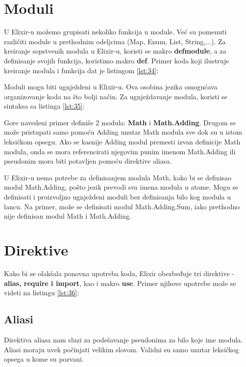 \documentclass[12pt,oneside]{memoir}
\begin{document}
\newpage

\section{Moduli}

U Elixir-u možemo grupisati nekoliko funkcija u module. Već su pomenuti različiti module u prethodnim odeljcima (Map, Enum, List, String,...). Za kreiranje sopstvenih modula u Elixir-u, koristi se  makro \textbf{defmodule}, a za definisanje svojih funkcija, koristimo makro \textbf{def}. Primer koda koji ilustruje kreiranje modula i funkcija dat je listingom \ref{lst:34}:



Moduli mogu biti ugnježdeni u Elixir-u. Ova osobina jezika omogućava organizovanje koda na što bolji način. Za ugnježdavanje modula, koristi se sintaksa sa listinga \ref{lst:35}:



Gore navedeni primer definiše 2 modula: \textbf{Math} i \textbf{Math.Adding}. Drugom se može pristupati samo pomoću Adding unutar Math modula sve dok su u istom leksičkom opsegu. Ako se kasnije Adding modul premesti izvan definicije Math modula, onda se mora referencirati njegovim punim imenom Math.Adding ili pseudonim mora biti potavljen pomoću direktive aliasa.

U Elixir-u nema potrebe za definisanjem modula Math, kako bi se definisao modul Math.Adding, pošto jezik prevodi sva imena modula u atome. Mogu se  definisati i proizvoljno ugnježdeni moduli bez definisanja bilo kog modula u lancu. Na primer, može se definisati modul Math.Adding.Sum, iako  prethodno nije definisan modul Math i Math.Adding.

\section{Direktive}

Kako bi se olakšala ponovna upotreba koda, Elixir obezbeđuje tri direktive - \textbf{alias, require i import}, kao i makro \textbf{use}. Primer njihove upotrebe može se videti na listingu \ref{lst:36}:



\subsection{Aliasi}
Direktiva aliasa nam sluzi za podešavanje pseudonima za bilo koje ime modula. Aliasi moraju uvek počinjati velikim slovom. Validni su samo unutar leksičkog opsega u kome su pozvani.
\end{document}
